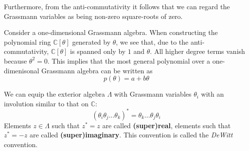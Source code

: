 	\begin{remark}
		Furthermore, from the anti-commutativity it follows that we can regard the Grassmann variables as being non-zero square-roots of zero.
	\end{remark}
	
	\begin{property}
		Consider a one-dimensional Grassmann algebra. When constructing the polynomial ring $\mathbb{C}[\theta]$ generated by $\theta$, we see that, due to the anti-commutativity, $\mathbb{C}[\theta]$ is spanned only by $1$ and $\theta$. All higher degree terms vanish because $\theta^2 = 0$. This implies that the most general polynomial over a one-dimenisonal Grassmann algebra can be written as
		\begin{equation}
			p(\theta) = a + b\theta
		\end{equation}
	\end{property}
	
	\begin{definition}
		We can equip the exterior algebra $\Lambda$ with Grassmann variables $\theta_i$ with an involution similar to that on $\mathbb{C}$:
		\begin{equation}
			(\theta_i\theta_j...\theta_k)^* = \theta_k...\theta_j\theta_i
		\end{equation}
		Elements $z\in\Lambda$ such that $z^* = z$ are called \textbf{(super)real}, elements such that $z^* = -z$ are called \textbf{(super)imaginary}. This convention is called the \textit{DeWitt} convention.
	\end{definition}
